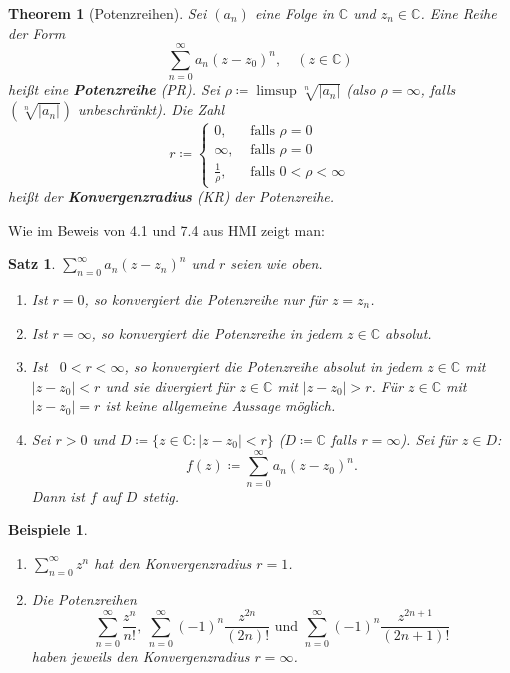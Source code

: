 \documentclass[12pt]{extreport} %
\newcommand{\C}{\mathbb{C}}
\theoremstyle{named}
\theoremstyle{nnamed}
\newtheorem*{unnamedtheorem*}{Theorem}
\theoremstyle{itshape}
\newtheorem{satz}[unnamedtheorem]{Satz}
\theoremstyle{normal}
\newtheorem*{beispiele}{Beispiele}
\begin{document}
 
\begin{unnamedtheorem*}[Potenzreihen]
	Sei $(a_{n})$ eine Folge in $\C$ und $z_{n} \in \C$. Eine Reihe der Form
	$$ \sum_{n=0}^{\infty} a_{n} \left( z - z_{0} \right)^{n}, \quad (z \in \C) $$
	hei{\ss}t eine \textbf{Potenzreihe} (PR). Sei $\rho \coloneqq \limsup \sqrt[n]{|a_{n}|}$ (also $\rho = \infty$, falls $\left( \sqrt[n]{|a_{n}|} \right)$ unbeschränkt). Die Zahl
	$$ r \coloneqq \begin{cases} 0, & \text{ falls } \rho = 0 \\ \infty, & \text{ falls } \rho = 0 \\ \frac{1}{\rho}, & \text{ falls } 0 < \rho < \infty \end{cases} $$
	hei{\ss}t der \textbf{Konvergenzradius} (KR) der Potenzreihe. 
\end{unnamedtheorem*}

Wie im Beweis von 4.1 und 7.4 aus HMI zeigt man:

\begin{satz} \label{17.3:satz}
	$\sum_{n=0}^{\infty} a_{n} \left( z - z_{n} \right)^{n}$ und $r$ seien wie oben.
	\begin{enumerate}
		\item Ist $r = 0$, so konvergiert die Potenzreihe nur für $z = z_{n}$. \label{17.3:satz-a}
		\item Ist $r = \infty$, so konvergiert die Potenzreihe in jedem $z \in \C$ absolut. \label{17.3:satz-b}
		\item Ist ~$0 < r < \infty$, so konvergiert die Potenzreihe absolut in jedem $z \in \C$ mit $|z - z_{0}| < r$ und sie divergiert für $z \in \C$ mit $|z - z_{0}| > r$. Für $z \in \C$ mit $|z - z_{0}| = r$ ist keine allgemeine Aussage möglich. \label{17.3:satz-c} %
		\item Sei $r > 0$ und $D \coloneqq \{ z \in \C: |z - z_{0}| < r \}$ ($D \coloneqq \C$ falls $r = \infty$). Sei für $z \in D$: 
			$$ f(z) \coloneqq \sum_{n=0}^{\infty} a_{n} (z - z_{0})^{n}. $$
			Dann ist $f$ auf $D$ stetig. \label{17.3:satz-d}
	\end{enumerate}
\end{satz}


\begin{beispiele} ~\
	\begin{enumerate}
		\item $\sum_{n=0}^{\infty} z^{n}$ hat den Konvergenzradius $r = 1$.
		\item Die Potenzreihen 
			$$ \sum_{n=0}^{\infty} \frac{z^{n}}{n!}, ~ \sum_{n=0}^{\infty} (-1)^{n} \frac{z^{2n}}{(2n)!} \text{ und } \sum_{n=0}^{\infty} (-1)^{n} \frac{z^{2n+1}}{(2n + 1)!} $$
			haben jeweils den Konvergenzradius $r = \infty$.
	\end{enumerate}	
\end{beispiele}
\end{document}
